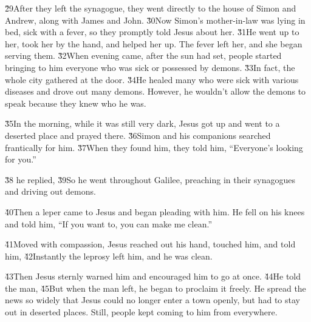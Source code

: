 \v{29}After they left the synagogue, they went directly to the house of Simon and Andrew, along with James and John. \v{30}Now Simon's mother-in-law was lying in bed, sick with a fever, so they promptly told Jesus about her. \v{31}He went up to her, took her by the hand, and helped her up. The fever left her, and she began serving them. \v{32}When evening came, after the sun had set, people started bringing to him everyone who was sick or possessed by demons. \v{33}In fact, the whole city gathered at the door. \v{34}He healed many who were sick with various diseases and drove out many demons. However, he wouldn't allow the demons to speak because they knew who he was.

\v{35}In the morning, while it was still very dark, Jesus got up and went to a deserted place and prayed there. \v{36}Simon and his companions searched frantically for him. \v{37}When they found him, they told him, ``Everyone's looking for you.''

\v{38} he replied,  \v{39}So he went throughout Galilee, preaching in their synagogues and driving out demons.

\v{40}Then a leper came to Jesus and began pleading with him. He fell on his knees and told him, ``If you want to, you can make me clean.''

\v{41}Moved with compassion, Jesus reached out his hand, touched him, and told him,  \v{42}Instantly the leprosy left him, and he was clean.

\v{43}Then Jesus sternly warned him and encouraged him to go at once. \v{44}He told the man,  \v{45}But when the man left, he began to proclaim it freely. He spread the news so widely that Jesus could no longer enter a town openly, but had to stay out in deserted places. Still, people kept coming to him from everywhere.

